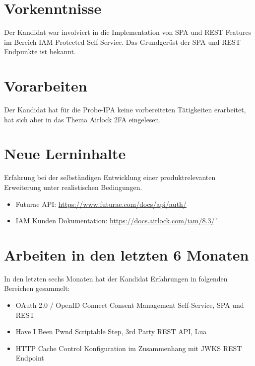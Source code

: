 \section{Vorkenntnisse}\label{sec:vorkenntnisse}
Der Kandidat war involviert in die Implementation von SPA und REST Features im Bereich IAM Protected Self-Service. \newline
Das Grundgerüst der SPA und REST Endpunkte ist bekannt.


\section{Vorarbeiten}\label{sec:vorarbeiten}
    Der Kandidat hat für die Probe-IPA keine vorbereiteten Tätigkeiten erarbeitet, hat sich aber in das Thema Airlock 2FA eingelesen.
\section{Neue Lerninhalte}\label{sec:neue-lerninhalte}
Erfahrung bei der selbständigen Entwicklung einer produktrelevanten Erweiterung unter realistischen Bedingungen.
\begin{itemize}
\item Futurae API: \url{https://www.futurae.com/docs/api/auth/} 
\item IAM Kunden Dokumentation: \url{https://docs.airlock.com/iam/8.3/}´
\end{itemize}

\section{Arbeiten in den letzten 6 Monaten}\label{sec:arbeiten-in-den-letzten-6-monaten}
In den letzten sechs Monaten hat der Kandidat Erfahrungen in folgenden Bereichen gesammelt:
\begin{itemize}
    \item OAuth 2.0 / OpenID Connect Consent Management Self-Service, SPA und REST
    \item Have I Been Pwnd Scriptable Step, 3rd Party REST API, Lua
    \item HTTP Cache Control Konfiguration im Zusammenhang mit JWKS REST Endpoint
\end{itemize}
